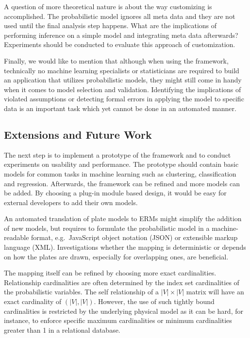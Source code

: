 A question of more theoretical nature is about the way customizing is accomplished. The probabilistic model ignores all meta data and they are not used until the final analysis step happens. What are the implications of performing inference on a simple model and integrating meta data afterwards? Experiments should be conducted to evaluate this approach of customization.

Finally, we would like to mention that although when using the framework, technically no machine learning specialists or statisticians are required to build an application that utilizes probabilistic models, they might still come in handy when it comes to model selection and validation. Identifying the implications of violated assumptions or detecting formal errors in applying the model to specific data is an important task which yet cannot be done in an automated manner.

\subsection{Extensions and Future Work}

The next step is to implement a prototype of the framework and to conduct experiments on usability and performance. The prototype should contain basic models for common tasks in machine learning such as clustering, classification and regression. Afterwards, the framework can be refined and more models can be added. By choosing a plug-in module based design, it would be easy for external developers to add their own models.

An automated translation of plate models to ERMs might simplify the addition of new models, but requires to formulate the probabilistic model in a machine-readable format, e.g.\ JavaScript object notation (JSON) or extensible markup language (XML). Investigations whether the mapping is deterministic or depends on how the plates are drawn, especially for overlapping ones, are beneficial.

The mapping itself can be refined by choosing more exact cardinalities. Relationship cardinalities are often determined by the index set cardinalities of the probabilistic variables. The self relationship of a $|V| \times |V|$ matrix will have an exact cardinality of $(|V|, |V|)$. However, the use of such tightly bound cardinalities is restricted by the underlying physical model as it can be hard, for instance, to enforce specific maximum cardinalities or minimum cardinalities greater than 1 in a relational database.

